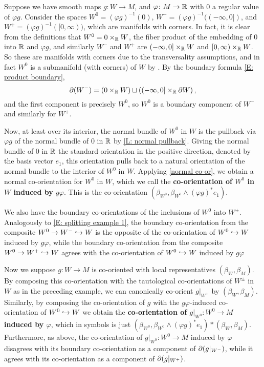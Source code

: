 \begin{example}\label{E: manifold decomposition}
	Suppose we have smooth maps $g \colon W \to M$, and $\varphi \colon M \to \mathbb{R}$ with $0$ a regular value of $\varphi g$.
	Consider the spaces $W^0 = (\varphi g)^{-1}(0)$, $W^- = (\varphi g)^{-1}((-\infty,0])$, and $W^+ = (\varphi g)^{-1}([0,\infty))$, which are manifolds with corners.
	In fact, it is clear from the definitions that $W^0 = 0 \times_{\mathbb{R}} W$, the fiber product of the embedding of $0$ into $\mathbb{R}$ and $\varphi g$, and similarly $W^-$ and $W^+$ are $(-\infty,0] \times_{\mathbb{R}} W$ and $[0,\infty) \times_{\mathbb{R}} W$. So these are manifolds with corners due to the transversality assumptions, and in fact $W^0$ is a submanifold (with corners) of $W$ by \cite[Proposition 4.2.9]{MaDo92}. By the boundary formula \cref{E: product boundary}, 
	$$\partial (W^-)= \left(0 \times_{\mathbb{R}} W\right) \sqcup \left((-\infty,0] \times_{\mathbb{R}} \partial W\right),$$
	and the first component is precisely $W^0$, so $W^0$ is a boundary component of $W^-$ and similarly for $W^+$.

	Now, at least over its interior, the normal bundle of $W^0$ in $W$ is the pullback via $\varphi g$ of the normal bundle of $0$ in $\mathbb{R}$ by \cref{L: normal pullback}. Giving the normal bundle of $0$ in $\mathbb{R}$ the standard orientation in the positive direction, denoted by the basis vector $e_1$, this orientation pulls back to a natural orientation of the normal bundle to the interior of $W^0$ in $W$. Applying \cref{normal co-or}, we obtain a normal co-orientation for $W^0$ in $W$, which we call the \textbf{co-orientation of $W^0$ in $W$ induced by $g\varphi$}. This is the co-orientation $(\beta_{W^0}, \beta_{W^0} \wedge (\varphi g)^*e_1)$.

	We also have the boundary co-orientations of the inclusions of $W^0$ into $W^{\pm}$.
	Analogously to \cref{E: splitting example 1}, the boundary co-orientation from the composite $W^0 \to W^- \hookrightarrow W$  is the opposite of the co-orientation of $W^0\hookrightarrow W$ induced by $g\varphi$, while the boundary co-orientation from the composite $W^0 \to W^+ \hookrightarrow W$  agrees with the co-orientation of $W^0\hookrightarrow W$ induced by $g\varphi$

	Now we suppose $g \colon W \to M$ is co-oriented with local representatives $(\beta_W, \beta_M)$.
	By composing this co-orientation with the tautological co-orientations of $W^\pm$ in $W$ as in the preceding example, we can canonically co-orient $g|_{W^\pm}$ by $(\beta_W, \beta_M)$.
	Similarly, by composing the co-orientation of $g$ with the $g\varphi$-induced co-orientation of $W^0 \hookrightarrow W$ we obtain the \textbf{co-orientation of $g|_{W^0} \colon W^0 \to M$ induced by $\varphi$}, which in symbols is just $(\beta_{W^0}, \beta_{W^0} \wedge (\varphi g)^*e_1)*(\beta_W,\beta_M)$.
	Furthermore, as above, the co-orientation of $g|_{W^0} \colon W^0 \to M$ induced by $\varphi$ disagrees with its boundary co-orientation as a component of $\partial(g|_{W^-})$, while it agrees with its co-orientation as a component of $\partial(g|_{W^+})$.


\end{example}
